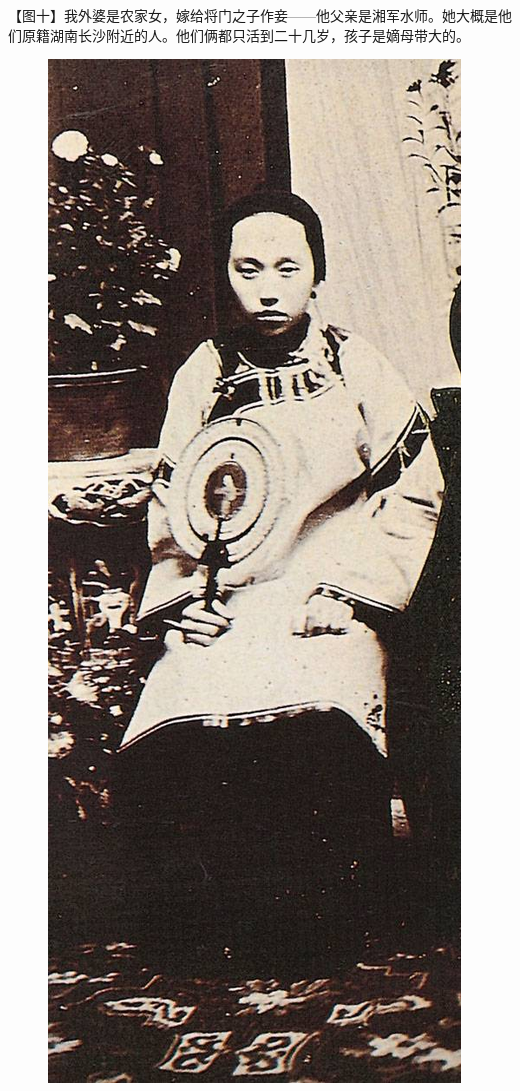 \clearpage
\par 【图十】我外婆是农家女，嫁给将门之子作妾——他父亲是湘军水师。她大概是他们原籍湖南长沙附近的人。他们俩都只活到二十几岁，孩子是嫡母带大的。
\begin{figure}[htb]
    \centering %
    \includegraphics[scale=0.4]{picture/对照记10.jpeg}
\end{figure}

